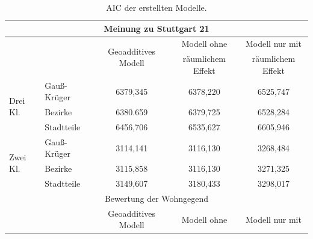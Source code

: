 \documentclass{Vorlage}
\begin{document}
\begin{table}[h]
\centering
\caption{AIC der erstellten Modelle.}
\label{stepAIC}
\begin{tabular}{llccc}
\hline \hline
\multicolumn{5}{c}{Meinung zu Stuttgart 21}                                                                                                                                            \\ \hline
                          & \multicolumn{1}{l|}{}             & \multicolumn{1}{c|}{\multirow{2}{*}{Geoadditives Modell}} & \multicolumn{1}{c|}{Modell ohne}       & Modell nur mit    \\
                          & \multicolumn{1}{l|}{}             & \multicolumn{1}{c|}{}                                     & \multicolumn{1}{c|}{räumlichem Effekt} & räumlichem Effekt \\ \hline
\multirow{3}{*}{Drei Kl.} & \multicolumn{1}{l|}{Gauß-Krüger} & \multicolumn{1}{c|}{6379,345}                             & \multicolumn{1}{c|}{6378,220}          & 6525,747          \\
                          & \multicolumn{1}{l|}{Bezirke}      & \multicolumn{1}{c|}{6380.659}                             & \multicolumn{1}{c|}{6379,725}              & 6528,284          \\
                          & \multicolumn{1}{l|}{Stadtteile}   & \multicolumn{1}{c|}{6456,706}                               & \multicolumn{1}{c|}{6535,627}          & 6605,946          \\ \hline
\multirow{3}{*}{Zwei Kl.} & \multicolumn{1}{l|}{Gauß-Krüger} & \multicolumn{1}{c|}{3114,141}                             & \multicolumn{1}{c|}{3116,130}           & 3268,484          \\
                          & \multicolumn{1}{l|}{Bezirke}      & \multicolumn{1}{c|}{3115,858}                             & \multicolumn{1}{c|}{3116,130}           & 3271,325          \\
                          & \multicolumn{1}{l|}{Stadtteile}   & \multicolumn{1}{c|}{3149,607}                              & \multicolumn{1}{c|}{3180,433}          & 3298,017          \\ \hline
\multicolumn{5}{c}{Bewertung der Wohngegend}                                                                                                                                           \\ \hline
                          & \multicolumn{1}{l|}{}             & \multicolumn{1}{c|}{\multirow{2}{*}{Geoadditives Modell}} & \multicolumn{1}{c|}{Modell ohne}       & Modell nur mit    \\

\end{tabular}
\end{table}
\end{document}
